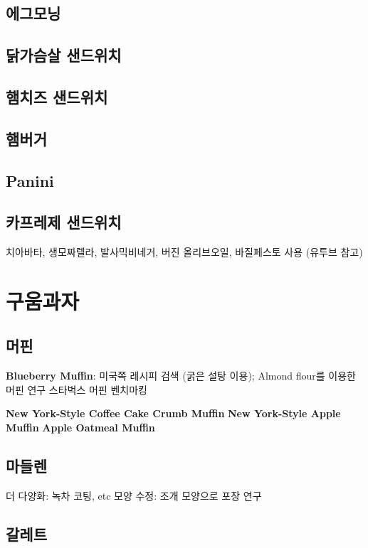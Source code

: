 \documentclass{myproc}
\begin{document}
\subsection{\textcolor{blue2}{에그모닝}}
\subsection{\textcolor{blue2}{닭가슴살 샌드위치}}
\subsection{\textcolor{blue2}{햄치즈 샌드위치}}
\subsection{\textcolor{blue2}{햄버거}}
\subsection{\textcolor{green2}{Panini}}
\subsection{\textcolor{green2}{카프레제 샌드위치}}
\bit
\w 치아바타, 생모짜렐라, 발사믹비네거, 버진 올리브오일, 바질페스토 사용 (유투브 참고)
\eit

\section{\textcolor{red2}{구움과자}}
\subsection{\textcolor{blue2}{머핀}}
\bit
\w \textcolor{green2}{\bf{}Blueberry Muffin}: 미국쪽 레시피 검색 (굵은 설탕
이용); Almond flour를 이용한 머핀 연구
\bit
\w 스타벅스 머핀 벤치마킹
\eit

\w \textcolor{green2}{\bf{}New York-Style Coffee Cake Crumb Muffin}
\w \textcolor{green2}{\bf{}New York-Style Apple Muffin}
\w \textcolor{green2}{\bf{}Apple Oatmeal Muffin}
\eit

\subsection{\textcolor{blue2}{마들렌}}
\bit
\w 더 다양화: 녹차 코팅, etc
\w 모양 수정: 조개 모양으로
\w 포장 연구
\eit

\subsection{\textcolor{blue2}{갈레트}}
\end{document}
